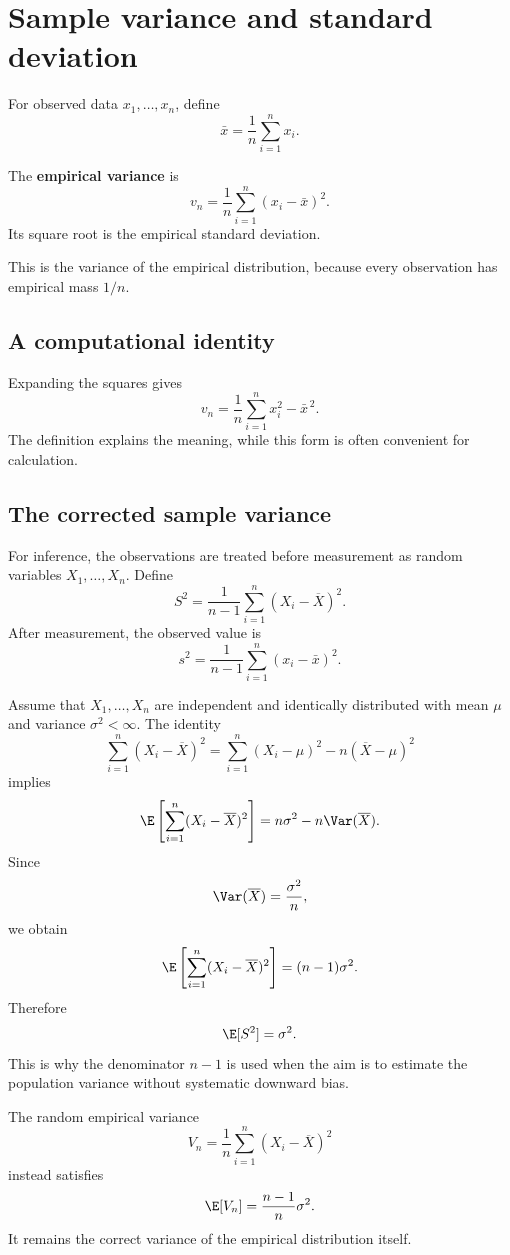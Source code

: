 \section{Sample variance and standard deviation}

For observed data \(x_1,\ldots,x_n\), define
\[
\bar x=\frac1n\sum_{i=1}^n x_i.
\]

\begin{definitionbox}
The \textbf{empirical variance} is
\[
v_n=\frac1n\sum_{i=1}^n(x_i-\bar x)^2.
\]
Its square root is the empirical standard deviation.
\end{definitionbox}

This is the variance of the empirical distribution, because every observation
has empirical mass \(1/n\).

\subsection*{A computational identity}

Expanding the squares gives
\[
v_n=\frac1n\sum_{i=1}^n x_i^2-\bar x^{\,2}.
\]
The definition explains the meaning, while this form is often convenient for
calculation.

\subsection*{The corrected sample variance}

For inference, the observations are treated before measurement as random
variables \(X_1,\ldots,X_n\). Define
\[
S^2=\frac1{n-1}\sum_{i=1}^n(X_i-\overline X)^2.
\]
After measurement, the observed value is
\[
s^2=\frac1{n-1}\sum_{i=1}^n(x_i-\bar x)^2.
\]

Assume that \(X_1,\ldots,X_n\) are independent and identically distributed with
mean \(\mu\) and variance \(\sigma^2<\infty\). The identity
\[
\sum_{i=1}^n(X_i-\overline X)^2
=
\sum_{i=1}^n(X_i-\mu)^2
-
n(\overline X-\mu)^2
\]
implies
\[
\E\left[\sum_{i=1}^n(X_i-\overline X)^2\right]
=
n\sigma^2-n\Var(\overline X).
\]
Since
\[
\Var(\overline X)=\frac{\sigma^2}{n},
\]
we obtain
\[
\E\left[\sum_{i=1}^n(X_i-\overline X)^2\right]
=(n-1)\sigma^2.
\]
Therefore
\[
\E[S^2]=\sigma^2.
\]
This is why the denominator \(n-1\) is used when the aim is to estimate the
population variance without systematic downward bias.

The random empirical variance
\[
V_n=\frac1n\sum_{i=1}^n(X_i-\overline X)^2
\]
instead satisfies
\[
\E[V_n]=\frac{n-1}{n}\sigma^2.
\]
It remains the correct variance of the empirical distribution itself.

